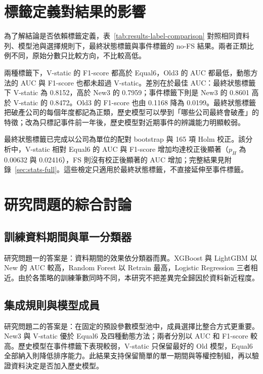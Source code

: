 \section{標籤定義對結果的影響}\label{sec:results-label}

為了解結論是否依賴標籤定義，表~\ref{tab:results-label-comparison} 對照相同資料列、模型池與選擇規則下，最終狀態標籤與事件標籤的 no-FS 結果。兩者正類比例不同，原始分數只比較方向，不比較高低。



兩種標籤下，V-static 的 F1-score 都高於 Equal6，Old3 的 AUC 都最低，動態方法的 AUC 與 F1-score 也都未超過 V-static。差別在於最佳 AUC：最終狀態標籤下 V-static 為 0.8152，高於 New3 的 0.7959；事件標籤下則是 New3 的 0.8601 高於 V-static 的 0.8472。Old3 的 F1-score 也由 0.1168 降為 0.0199。最終狀態標籤把破產公司的每個年度都記為正類，歷史模型可以學到「哪些公司最終會破產」的特徵；改為只標記事件前一年後，歷史模型對近期事件的辨識能力明顯較弱。

最終狀態標籤已完成以公司為單位的配對 bootstrap 與 165 項 Holm 校正。該分析中，V-static 相對 Equal6 的 AUC 與 F1-score 增加均達校正後顯著（\(p_H\) 為 0.00632 與 0.02416），FS 則沒有校正後顯著的 AUC 增加；完整結果見附錄~\ref{sec:stats-full}。這些檢定只適用於最終狀態標籤，不直接延伸至事件標籤。

\section{研究問題的綜合討論}\label{sec:results-discussion}

\subsection{訓練資料期間與單一分類器}

研究問題一的答案是：資料期間的效果依分類器而異。XGBoost 與 LightGBM 以 New 的 AUC 較高，Random Forest 以 Retrain 最高，Logistic Regression 三者相近。由於各策略的訓練筆數同時不同，本研究不把差異完全歸因於資料新近程度。

\subsection{集成規則與模型成員}

研究問題二的答案是：在固定的預設參數模型池中，成員選擇比整合方式更重要。New3 與 V-static 優於 Equal6 及四種動態方法；兩者分別以 AUC 和 F1-score 較高。歷史模型在事件標籤下表現較弱，V-static 只保留最好的 Old 模型，Equal6 全部納入則降低排序能力。此結果支持保留簡單的單一期間與等權控制組，再以驗證資料決定是否加入歷史模型。

